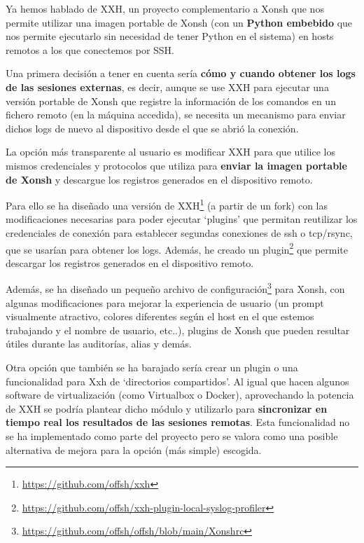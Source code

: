 Ya hemos hablado de XXH, un proyecto complementario a Xonsh que nos permite utilizar una imagen portable de Xonsh (con un \textbf{Python embebido} que nos permite ejecutarlo sin necesidad de tener Python en el sistema) en hosts remotos a los que conectemos por SSH. 


Una primera decisión a tener en cuenta sería \textbf{cómo y cuando obtener los logs de las sesiones externas}, es decir, aunque se use XXH para ejecutar una versión portable de Xonsh que registre la información de los comandos en un fichero remoto (en la máquina accedida), se necesita un mecanismo para enviar dichos logs de nuevo al dispositivo desde el que se abrió la conexión.

La opción más transparente al usuario es modificar XXH para que utilice los mismos credenciales y protocolos que utiliza para \textbf{enviar la imagen portable de Xonsh} y descargue los registros generados en el dispositivo remoto.

Para ello se ha diseñado una versión de XXH\footnote{\url{https://github.com/offsh/xxh}} (a partir de un \gls{fork}) con las modificaciones necesarias para poder ejecutar `plugins' que permitan reutilizar los credenciales de conexión para establecer segundas conexiones de ssh o tcp/rsync, que se usarían para obtener los logs. Además, he creado un plugin\footnote{\url{https://github.com/offsh/xxh-plugin-local-syslog-profiler}} que permite descargar los registros generados en el dispositivo remoto. 



Además, se ha diseñado un pequeño archivo de configuración\footnote{\url{https://github.com/offsh/offsh/blob/main/Xonshrc}} para Xonsh, con algunas modificaciones para mejorar la experiencia de usuario (un prompt visualmente atractivo, colores diferentes según el host en el que estemos trabajando y el nombre de usuario, etc..), plugins de Xonsh que pueden resultar útiles durante las auditorías, alias y demás.

Otra opción que también se ha barajado sería crear un plugin o una funcionalidad para Xxh de `directorios compartidos'. Al igual que hacen algunos software de virtualización (como Virtualbox o Docker), aprovechando la potencia de XXH se podría plantear dicho módulo y utilizarlo para \textbf{sincronizar en tiempo real los resultados de las sesiones remotas}. Esta funcionalidad no se ha implementado como parte del proyecto pero se valora como una posible alternativa de mejora para la opción (más simple) escogida.

